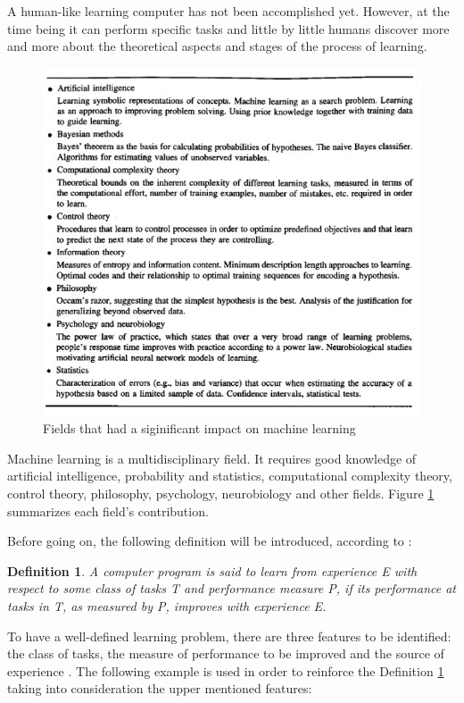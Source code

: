 \documentclass[runningheads,a4paper,12pt]{report}
\newtheorem{theorem}{Definition}
\begin{document}
A human-like learning computer has not been accomplished yet. However, at the time being it can perform specific tasks and little by little humans discover more and more about the theoretical aspects and stages of the process of learning. 

\begin{figure}
	\centering
	\includegraphics[width=1\linewidth]{./images/1_ml_fields}
	\caption{Fields that had a siginificant impact on machine learning \cite{mitchell}}
	\label{fig:fields}
\end{figure}

Machine learning is a multidisciplinary field. It requires good knowledge of artificial intelligence, probability and statistics, computational complexity theory, control theory, philosophy, psychology, neurobiology and other fields. Figure \ref{fig:fields} summarizes each field's contribution. 

Before going on, the following definition will be introduced, according to \cite{mitchell}:

\begin{theorem}
\label{learning_def}
A computer program is said to learn from experience E with respect to some class of tasks T and performance measure P, if its performance at tasks in T, as measured by P, improves with experience E.
\end{theorem}

To have a well-defined learning problem, there are three features to be identified: the class of tasks, the measure of performance to be improved and the source of experience \cite{mitchell}. The following example is used in order to reinforce the Definition \ref{learning_def} taking into consideration the upper mentioned features: 
\end{document}
